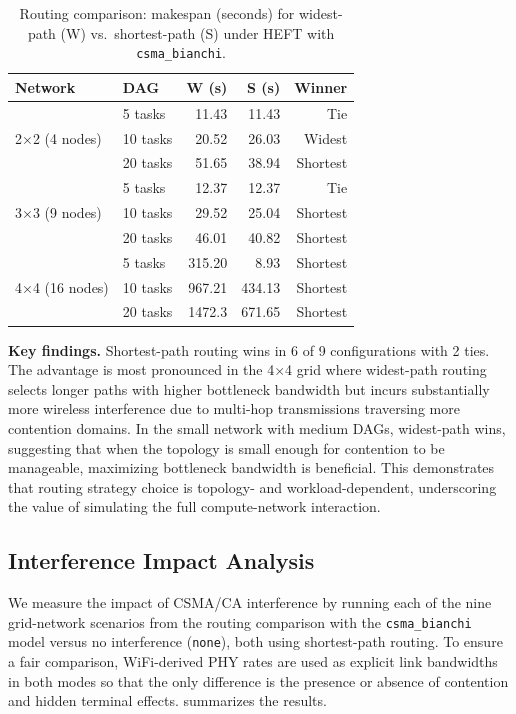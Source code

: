 \documentclass[conference]{IEEEtran}
\begin{document}
\begin{table}[t]
\centering
\caption{Routing comparison: makespan (seconds) for widest-path (W) vs.\
shortest-path (S) under HEFT with \texttt{csma\_bianchi}.}
\label{tab:routing}
\begin{tabular}{@{}llrrr@{}}
\toprule
\textbf{Network} & \textbf{DAG} & \textbf{W (s)} & \textbf{S (s)} & \textbf{Winner} \\
\midrule
\multirow{3}{*}{2$\times$2 (4 nodes)}
  & 5 tasks   & 11.43  & 11.43  & Tie \\
  & 10 tasks  & 20.52  & 26.03  & Widest \\
  & 20 tasks  & 51.65  & 38.94  & Shortest \\
\midrule
\multirow{3}{*}{3$\times$3 (9 nodes)}
  & 5 tasks   & 12.37  & 12.37  & Tie \\
  & 10 tasks  & 29.52  & 25.04  & Shortest \\
  & 20 tasks  & 46.01  & 40.82  & Shortest \\
\midrule
\multirow{3}{*}{4$\times$4 (16 nodes)}
  & 5 tasks   & 315.20 & 8.93   & Shortest \\
  & 10 tasks  & 967.21 & 434.13 & Shortest \\
  & 20 tasks  & 1472.3 & 671.65 & Shortest \\
\bottomrule
\end{tabular}
\end{table}

\textbf{Key findings.}
Shortest-path routing wins in 6 of 9 configurations with 2 ties.  The
advantage is most pronounced in the 4$\times$4 grid where widest-path
routing selects longer paths with higher bottleneck bandwidth but
incurs substantially more wireless interference due to multi-hop
transmissions traversing more contention domains.  In the small network with
medium DAGs, widest-path wins, suggesting that when the topology is small
enough for contention to be manageable, maximizing bottleneck bandwidth is
beneficial.  This demonstrates that routing strategy choice is
topology- and workload-dependent, underscoring the value of simulating the
full compute-network interaction.

\subsection{Interference Impact Analysis}
\label{sec:interference_eval}

We measure the impact of CSMA/CA interference by running each of the nine
grid-network scenarios from the routing comparison with the
\texttt{csma\_bianchi} model versus no interference (\texttt{none}), both
using shortest-path routing.  To ensure a fair comparison, WiFi-derived
PHY rates are used as explicit link bandwidths in both modes so that the
only difference is the presence or absence of contention and hidden terminal
effects.  \Cref{tab:interference} summarizes the results.
\end{document}
